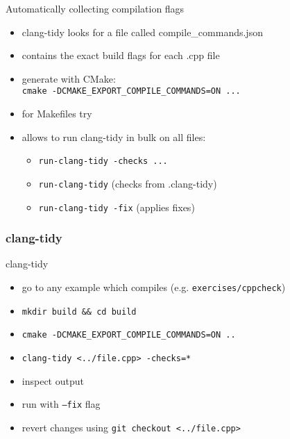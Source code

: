 \begin{frame}[fragile]
  \begin{block}{Automatically collecting compilation flags}
    \begin{itemize}
      \item clang-tidy looks for a file called compile\_commands.json
      \item contains the exact build flags for each .cpp file
      \item generate with CMake: \\
        \texttt{cmake -DCMAKE_EXPORT_COMPILE_COMMANDS=ON ...}
      \item for Makefiles try \href{https://github.com/rizsotto/Bear}{}
      \item allows to run clang-tidy in bulk on all files:
      \begin{itemize}
        \item \texttt{run-clang-tidy -checks ...}
        \item \texttt{run-clang-tidy} (checks from .clang-tidy)
        \item \texttt{run-clang-tidy -fix} (applies fixes)
      \end{itemize}
    \end{itemize}
  \end{block}
\end{frame}

\begin{frame}[fragile]
  \frametitle{clang-tidy}
  \begin{exercise}{clang-tidy}
    \begin{itemize}
      \item go to any example which compiles (e.g. \texttt{exercises/cppcheck})
      \item \texttt{mkdir build && cd build}
      \item \texttt{cmake -DCMAKE_EXPORT_COMPILE_COMMANDS=ON ..}
      \item \texttt{clang-tidy <../file.cpp> -checks=*}
      \item inspect output
      \item run with \texttt{--fix} flag
      \item revert changes using \texttt{git checkout <../file.cpp>}
    \end{itemize}
  \end{exercise}
\end{frame}
